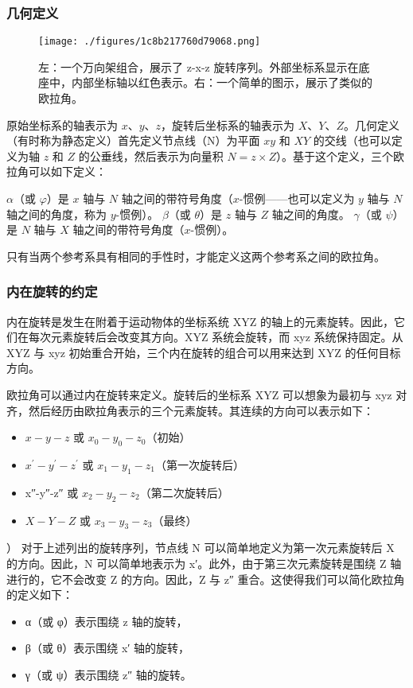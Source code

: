 \subsubsection{几何定义}  
\begin{figure}[ht]
\centering
\texttt{[image: ./figures/1c8b217760d79068.png]}
\caption{左：一个万向架组合，展示了 z-x-z 旋转序列。外部坐标系显示在底座中，内部坐标轴以红色表示。右：一个简单的图示，展示了类似的欧拉角。} \label{fig_OLJ_2}
\end{figure}
原始坐标系的轴表示为 \(x\)、\(y\)、\(z\)，旋转后坐标系的轴表示为 \(X\)、\(Y\)、\(Z\)。几何定义（有时称为静态定义）首先定义节点线（N）为平面 \(xy\) 和 \(XY\) 的交线（也可以定义为轴 \(z\) 和 \(Z\) 的公垂线，然后表示为向量积 \(N = z \times Z\)）。基于这个定义，三个欧拉角可以如下定义：

\(\alpha\)（或 \(\varphi\)）是 \(x\) 轴与 \(N\) 轴之间的带符号角度（\(x\)-惯例——也可以定义为 \(y\) 轴与 \(N\) 轴之间的角度，称为 \(y\)-惯例）。  
\(\beta\)（或 \(\theta\)）是 \(z\) 轴与 \(Z\) 轴之间的角度。  
\(\gamma\)（或 \(\psi\)）是 \(N\) 轴与 \(X\) 轴之间的带符号角度（\(x\)-惯例）。  

只有当两个参考系具有相同的手性时，才能定义这两个参考系之间的欧拉角。

\subsubsection{内在旋转的约定}
内在旋转是发生在附着于运动物体的坐标系统 XYZ 的轴上的元素旋转。因此，它们在每次元素旋转后会改变其方向。XYZ 系统会旋转，而 xyz 系统保持固定。从 XYZ 与 xyz 初始重合开始，三个内在旋转的组合可以用来达到 XYZ 的任何目标方向。

欧拉角可以通过内在旋转来定义。旋转后的坐标系 XYZ 可以想象为最初与 xyz 对齐，然后经历由欧拉角表示的三个元素旋转。其连续的方向可以表示如下：
\begin{itemize}
\item $x-y-z$ 或 $x_0-y_0-z_0$（初始）  
\item $x^\prime-y^\prime-z^\prime$ 或 $x_1-y_1-z_1$（第一次旋转后）  
\item x″-y″-z″ 或 $x_2-y_2-z_2$（第二次旋转后）  
\item $X-Y-Z$ 或 $x_3-y_3-z_3$（最终）
\end{itemize}）
对于上述列出的旋转序列，节点线 N 可以简单地定义为第一次元素旋转后 X 的方向。因此，N 可以简单地表示为 x′。此外，由于第三次元素旋转是围绕 Z 轴进行的，它不会改变 Z 的方向。因此，Z 与 z″ 重合。这使得我们可以简化欧拉角的定义如下：
\begin{itemize}
\item α（或 φ）表示围绕 z 轴的旋转，  
\item β（或 θ）表示围绕 x′ 轴的旋转，  
\item γ（或 ψ）表示围绕 z″ 轴的旋转。
\end{itemize}
